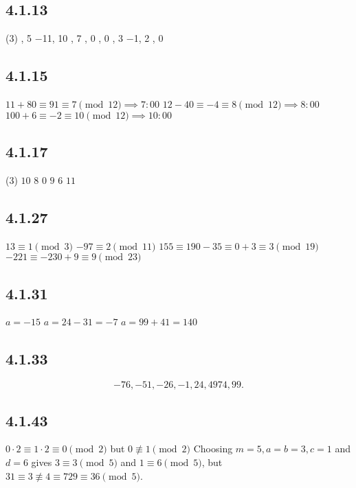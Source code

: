\documentclass[12pt,titlepage]{extarticle}
\begin{document}
\subsection*{4.1.13}
\begin{tasks}(3)
    , 5 
    \task −11, 10 
    , 7 
    , 0
    , 0 
    , 3 
    \task −1, 2 
    , 0
\end{tasks}

\subsection*{4.1.15}
\begin{tasks}
    \task $11 + 80 \equiv 91 \equiv 7 \pmod{12} \implies 7:00$
    \task $12 - 40 \equiv -4 \equiv 8 \pmod{12} \implies 8:00$
    \task $100 + 6 \equiv -2 \equiv 10 \pmod{12} \implies 10:00$
\end{tasks}

\subsection*{4.1.17}
\begin{tasks}(3)
    \task $10 $
    \task $8  $
    \task $0  $
    \task $9  $
    \task $6  $
    \task $11 $
\end{tasks}

\subsection*{4.1.27}
\begin{tasks}
    \task $13 \equiv 1 \pmod{3}$
    \task $-97 \equiv 2  \pmod{11}$
    \task $155 \equiv 190 - 35 \equiv 0 + 3 \equiv 3 \pmod{19}$
    \task $-221 \equiv -230 + 9 \equiv 9 \pmod{23}$
\end{tasks}

\subsection*{4.1.31}
\begin{tasks}
    \task $a = -15$
    \task $a = 24 - 31 = -7$
    \task $a = 99 + 41 = 140$
\end{tasks}

\subsection*{4.1.33}
\[
    -76 ,-51, -26 ,-1, 24, 49 74, 99
.\]

\subsection*{4.1.43}
\begin{tasks}
    \task $0 \cdot 2 \equiv 1 \cdot 2 \equiv 0 \pmod{2}$ but $0 \not\equiv 1 \pmod{2}$
    \task Choosing $m = 5, a = b = 3, c = 1$ and $d = 6$ gives $3 \equiv 3 \pmod{5}$ and $1 \equiv 6 \pmod{5}$, but $31 \equiv 3 \not\equiv 4 \equiv 729 \equiv 36 \pmod{5}$.
\end{tasks}
\end{document}
